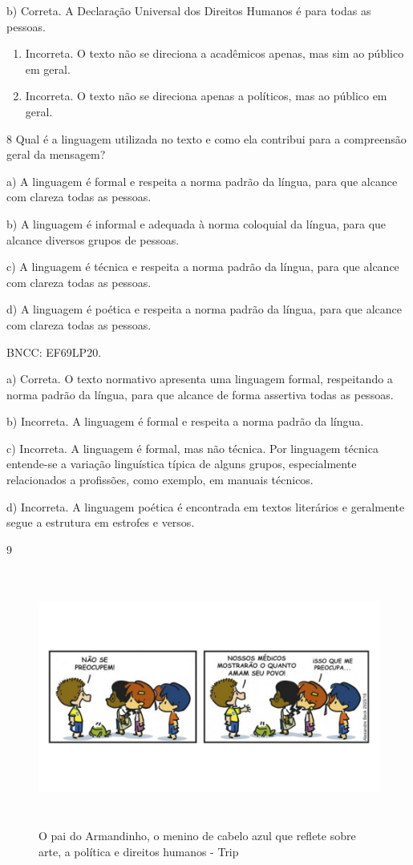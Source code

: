 {b) Correta. A Declaração Universal dos Direitos Humanos é para todas as
pessoas.

\begin{enumerate}
\def\labelenumi{\alph{enumi})}
\setcounter{enumi}{2}
\item
  Incorreta. O texto não se direciona a acadêmicos apenas, mas sim ao
  público em geral.
\item
  Incorreta. O texto não se direciona apenas a políticos, mas ao público
  em geral.
\end{enumerate}

\num{8} Qual é a linguagem utilizada no texto e como ela contribui para
a compreensão geral da mensagem?

a) A linguagem é formal e respeita a norma padrão da língua, para que
alcance com clareza todas as pessoas.

b) A linguagem é informal e adequada à norma coloquial da língua, para
que alcance diversos grupos de pessoas.

c) A linguagem é técnica e respeita a norma padrão da língua, para que
alcance com clareza todas as pessoas.

d) A linguagem é poética e respeita a norma padrão da língua, para que
alcance com clareza todas as pessoas.

BNCC: EF69LP20.

a) Correta. O texto normativo apresenta uma linguagem formal,
respeitando a norma padrão da língua, para que alcance de forma
assertiva todas as pessoas.

b) Incorreta. A linguagem é formal e respeita a norma padrão da língua.

c) Incorreta. A linguagem é formal, mas não técnica. Por linguagem
técnica entende-se a variação linguística típica de alguns grupos,
especialmente relacionados a profissões, como exemplo, em manuais
técnicos.

d) Incorreta. A linguagem poética é encontrada em textos literários e
geralmente segue a estrutura em estrofes e versos.

\num{9}

\begin{figure}
\centering
\includegraphics[width=5.90556in,height=3.32222in]{./imgSAEB_6_POR/media/image45.jpeg}
\caption{O pai do Armandinho, o menino de cabelo azul que reflete sobre
arte, a política e direitos humanos - Trip}
\end{figure}

}
